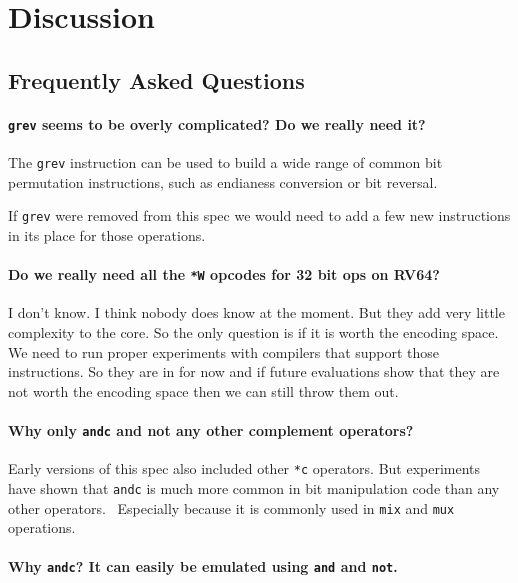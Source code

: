 \chapter{Discussion}

\section{Frequently Asked Questions}

\subsubsection{\texttt{grev} seems to be overly complicated? Do we really need it?}

The \texttt{grev} instruction can be used to build a wide range of common
bit permutation instructions, such as endianess conversion or bit reversal.

If \texttt{grev} were removed from this spec we would need to add a few
new instructions in its place for those operations.

\subsubsection{Do we really need all the \texttt{*W} opcodes for 32 bit ops on RV64?}

I don't know. I think nobody does know at the moment. But they add very little
complexity to the core. So the only question is if it is worth the encoding
space. We need to run proper experiments with compilers that support those
instructions. So they are in for now and if future evaluations show that they
are not worth the encoding space then we can still throw them out.

\subsubsection{Why only \texttt{andc} and not any other complement operators?}

Early versions of this spec also included other \texttt{*c} operators. But
experiments have shown that \texttt{andc} is much more common in bit
manipulation code than any other operators.~\cite{Wolf17A}
Especially because it is commonly used in \texttt{mix} and \texttt{mux} operations.

\subsubsection{Why \texttt{andc}? It can easily be emulated using \texttt{and} and \texttt{not}.}

